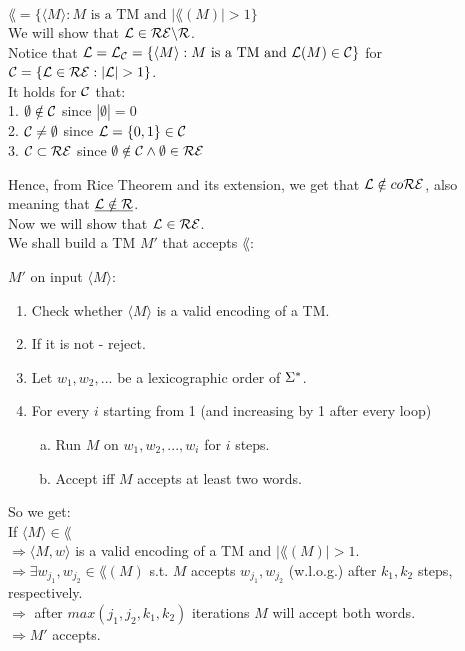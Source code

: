 $\lang = \{\langle M \rangle : M \text{ is a TM and } |\lang(M)| > 1\}$ \\

We will show that $\mathcal{L} \in \mathcal{R}\mathcal{E} \backslash \mathcal{R}$. \\

Notice that $\mathcal{L} = \mathcal{L}_{\mathcal{C}} = \{\langle M \rangle : M \text{ is a TM and } \mathcal{L}(M) \in \mathcal{C}\}$ for $\mathcal{C} = \{\mathcal{L} \in \mathcal{R}\mathcal{E} : |\mathcal{L}| > 1\}$. \\
It holds for $\mathcal{C}$ that: \\
1. $\emptyset \notin \mathcal{C}$ since $|\emptyset| = 0$ \\
2. $\mathcal{C} \neq \emptyset$ since $\mathcal{L} = \{0, 1\} \in \mathcal{C}$ \\
3. $\mathcal{C} \subset \mathcal{R}\mathcal{E}$ since $\emptyset \notin \mathcal{C} \wedge \emptyset \in \mathcal{R}\mathcal{E}$

Hence, from Rice Theorem and its extension, we get that $\mathcal{L} \notin co\mathcal{R}\mathcal{E}$, also meaning that $\underline{\mathcal{L} \notin \mathcal{R}}$. \\

Now we will show that $\mathcal{L} \in \mathcal{R}\mathcal{E}$. \\
We shall build a TM $M'$ that accepts $\lang$:

$M'$ on input $\langle M \rangle$:
\begin{enumerate}[1., itemsep=5pt]
    \item Check whether $\langle M \rangle$ is a valid encoding of a TM.

    \item If it is not - reject.

    \item Let $w_1, w_2, ...$ be a lexicographic order of $\Sigma^*$.

    \item For every $i$ starting from 1 (and increasing by 1 after every loop)

          \begin{enumerate}[a., itemsep=5pt]
              \item \qquad Run $M$ on $w_1, w_2, ..., w_i$ for $i$ steps.
              \item \qquad Accept iff $M$ accepts at least two words.
          \end{enumerate}

\end{enumerate}

So we get: \\
If $\langle M \rangle \in \lang$ \\
$\Longrightarrow \langle M, w \rangle$ is a valid encoding of a TM and $|\lang(M)| > 1$. \\
$\Longrightarrow \exists w_{j_1}, w_{j_2} \in \lang(M)$ s.t. $M$ accepts $w_{j_1}, w_{j_2}$ (w.l.o.g.) after $k_1, k_2$ steps, respectively. \\
$\Longrightarrow$ after $max(j_1, j_2, k_1, k_2)$ iterations $M$ will accept both words. \\
$\Longrightarrow M'$ accepts. \\

